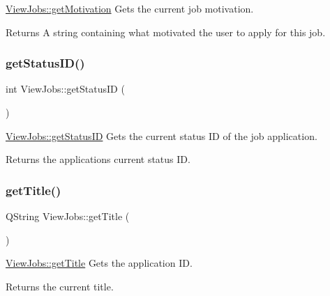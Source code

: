 \mbox{\hyperlink{class_view_jobs_a238ec5365ef2c39baa97670769dfedca}{View\+Jobs\+::get\+Motivation}} Gets the current job motivation. 

\begin{DoxyReturn}{Returns}
A string containing what motivated the user to apply for this job. 
\end{DoxyReturn}
\mbox{\label{class_view_jobs_a91696fde9f0a663bae929390aac8324b}} 
\subsubsection{\texorpdfstring{get\+Status\+I\+D()}{getStatusID()}}
{\footnotesize\ttfamily int View\+Jobs\+::get\+Status\+ID (\begin{DoxyParamCaption}{ }\end{DoxyParamCaption})}



\mbox{\hyperlink{class_view_jobs_a91696fde9f0a663bae929390aac8324b}{View\+Jobs\+::get\+Status\+ID}} Gets the current status ID of the job application. 

\begin{DoxyReturn}{Returns}
the application\textquotesingle{}s current status ID. 
\end{DoxyReturn}
\mbox{\label{class_view_jobs_ae78f119d37c77a9e3e457ecfd78d7de3}} 
\subsubsection{\texorpdfstring{get\+Title()}{getTitle()}}
{\footnotesize\ttfamily Q\+String View\+Jobs\+::get\+Title (\begin{DoxyParamCaption}{ }\end{DoxyParamCaption})}



\mbox{\hyperlink{class_view_jobs_ae78f119d37c77a9e3e457ecfd78d7de3}{View\+Jobs\+::get\+Title}} Gets the application ID. 

\begin{DoxyReturn}{Returns}
the current title. 
\end{DoxyReturn}
\mbox{\label{class_view_jobs_a5f75b45d28ce7f4a8050ce9ce0f44350}} 
